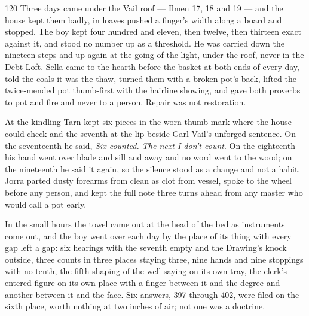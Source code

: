 
\scenebreak


\scenebreak


\scenebreak

\CRtailpiece
\begin{CRchronicle}{120}
Three days came under the Vail roof — Ilmen 17, 18 and 19 — and the house kept them badly, in loaves pushed a finger’s width along a board and stopped. The boy kept four hundred and eleven, then twelve, then thirteen exact against it, and stood no number up as a threshold. He was carried down the nineteen steps and up again at the going of the light, under the roof, never in the Debt Loft. Sella came to the hearth before the basket at both ends of every day, told the coals it was the thaw, turned them with a broken pot’s back, lifted the twice-mended pot thumb-first with the hairline showing, and gave both proverbs to pot and fire and never to a person. Repair was not restoration.

At the kindling Tarn kept six pieces in the worn thumb-mark where the house could check and the seventh at the lip beside Garl Vail’s unforged sentence. On the seventeenth he said, \emph{Six counted. The next I don’t count}. On the eighteenth his hand went over blade and sill and away and no word went to the wood; on the nineteenth he said it again, so the silence stood as a change and not a habit. Jorra parted dusty forearms from clean as clot from vessel, spoke to the wheel before any person, and kept the full note three turns ahead from any master who would call a pot early.

In the small hours the towel came out at the head of the bed as instruments come out, and the boy went over each day by the place of its thing with every gap left a gap: six hearings with the seventh empty and the Drawing’s knock outside, three counts in three places staying three, nine hands and nine stoppings with no tenth, the fifth shaping of the well-saying on its own tray, the clerk’s entered figure on its own place with a finger between it and the degree and another between it and the face. Six answers, 397 through 402, were filed on the sixth place, worth nothing at two inches of air; not one was a doctrine.


\end{CRchronicle}
